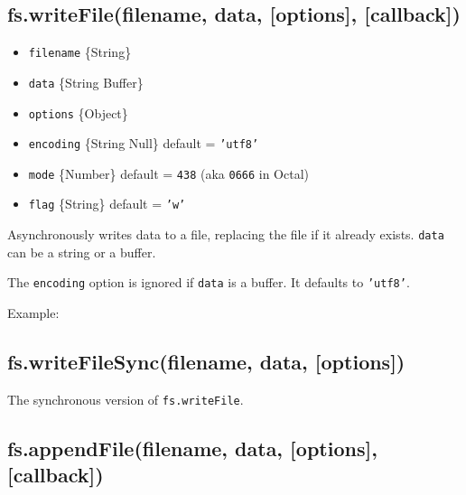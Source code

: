 \subsection{fs.writeFile(filename, data, {[}options{]}, {[}callback{]})}

\begin{itemize}
\item
  \texttt{filename} \{String\}
\item
  \texttt{data} \{String \textbar{} Buffer\}
\item
  \texttt{options} \{Object\}
\item
  \texttt{encoding} \{String \textbar{} Null\} default = \texttt{'utf8'}
\item
  \texttt{mode} \{Number\} default = \texttt{438} (aka \texttt{0666} in
  Octal)
\item
  \texttt{flag} \{String\} default = \texttt{'w'}
\end{itemize}

Asynchronously writes data to a file, replacing the file if it already
exists. \texttt{data} can be a string or a buffer.

The \texttt{encoding} option is ignored if \texttt{data} is a buffer. It
defaults to \texttt{'utf8'}.

Example:

\begin{Shaded}
\begin{Highlighting}[]
\NormalTok{(}\NormalTok{, }\NormalTok{, } 
    
  \NormalTok{(}\NormalTok{);}
\NormalTok{\});}
\end{Highlighting}
\end{Shaded}

\subsection{fs.writeFileSync(filename, data, {[}options{]})}

The synchronous version of \texttt{fs.writeFile}.

\subsection{fs.appendFile(filename, data, {[}options{]},
{[}callback{]})}

